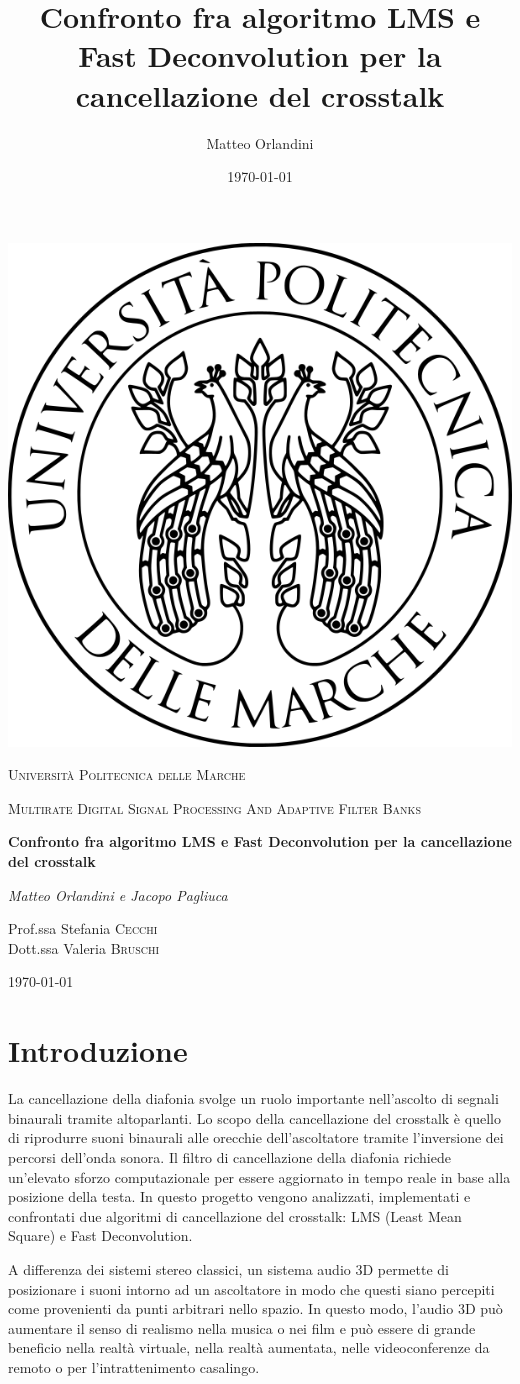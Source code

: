 \documentclass[12pt,a4paper,titlepage]{article}
\title{Confronto fra algoritmo LMS e Fast Deconvolution per la cancellazione del crosstalk}
\author{Matteo Orlandini}
\date{\today}
\begin{document}
\begin{titlepage}
	
	\centering
	\includegraphics[width=.2\textwidth]{Immagini/univpmlogo}\par\vspace{1cm}
	{\scshape\LARGE Università Politecnica delle Marche\par}
	\vspace{1cm}
	{\scshape\Large Multirate Digital Signal Processing And Adaptive Filter Banks \par}
	\vspace{1.5cm}
	{\huge\bfseries Confronto fra algoritmo LMS e Fast Deconvolution per la cancellazione del crosstalk \par}
	\vspace{2cm}
	{\Large\itshape Matteo Orlandini e Jacopo Pagliuca\par}
	\vfill
	Prof.ssa Stefania \textsc{Cecchi}\\
	Dott.ssa Valeria \textsc{Bruschi}
	
	\vfill
	
	{\large \today\par}
\end{titlepage}

\thispagestyle{empty}
\tableofcontents

\newpage
\setcounter{page}{1}
\section{Introduzione}
\label{sec:Introduzione}    
La cancellazione della diafonia svolge un ruolo importante nell'ascolto di segnali binaurali tramite altoparlanti. Lo scopo della cancellazione del crosstalk è quello di riprodurre suoni binaurali alle orecchie dell'ascoltatore tramite l'inversione dei percorsi dell'onda sonora. Il filtro di cancellazione della diafonia richiede un'elevato sforzo computazionale per essere aggiornato in tempo reale in base alla posizione della testa. In questo progetto vengono analizzati, implementati e confrontati due algoritmi di cancellazione del crosstalk: LMS (Least Mean Square) e Fast Deconvolution.

A differenza dei sistemi stereo classici, un sistema audio 3D permette di posizionare i suoni intorno ad un ascoltatore in modo che questi siano percepiti come provenienti da punti arbitrari nello spazio. In questo modo, l'audio 3D può  aumentare il senso di realismo nella musica o nei film e può essere di grande beneficio nella realtà virtuale, nella realtà aumentata, nelle videoconferenze da remoto o per l'intrattenimento casalingo.
\end{document}

